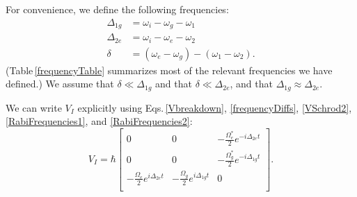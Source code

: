 For convenience, we define the following frequencies: 
\begin{align}
\label{frequencyDiffs}
\Delta_{1g}&=\omega_i-\omega_g-\omega_1\\
\Delta_{2e}&=\omega_i-\omega_e-\omega_2\\
\delta&=(\omega_e-\omega_g)-(\omega_1-\omega_2).
\end{align}
(Table\,\ref{frequencyTable} summarizes most of the relevant frequencies we have defined.) We assume that $\delta\ll\Delta_{1g}$ and that $\delta\ll\Delta_{2e}$, and that $\Delta_{1g}\approx\Delta_{2e}$.

We can write $V_I$ explicitly using Eqs.\,\eqref{Vbreakdown}, \eqref{frequencyDiffs}, \eqref{VSchrod2}, \eqref{RabiFrequencies1}, and \eqref{RabiFrequencies2}:
\begin{equation}
\label{VI_matrix_simplified}
V_I=
\hbar
\begin{bmatrix}
0 & 0 & -\frac{\Omega_e^*}{2}e^{-i\Delta_{2e}t} \\
0 & 0 & -\frac{\Omega_g^*}{2}e^{-i\Delta_{1g}t}\\
-\frac{\Omega_e}{2}e^{i\Delta_{2e}t} & -\frac{\Omega_{g}}{2}e^{i\Delta_{1g}t} & 0 \\
\end{bmatrix}.
\end{equation}

